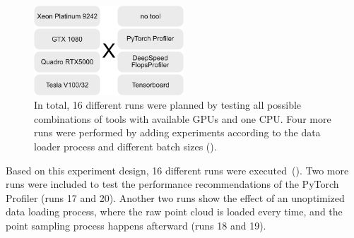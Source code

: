 \documentclass[12pt, a4paper, hidelinks]{article}
\begin{document}
\begin{figure}[H]
\centering
\includegraphics[width=0.5\textwidth]{./assets/experiments.png}
\caption[Overview of the runs]{In total, 16 different runs were planned by testing all possible combinations of tools with available \ac{GPU}s and one \ac{CPU}. Four more runs were performed by adding experiments according to the data loader process and different batch sizes ().}
\label{fig:experiments}
\end{figure}

Based on this experiment design, 16 different runs were executed~().
Two more runs were included to test the performance recommendations of the PyTorch Profiler (runs 17 and 20).
Another two runs show the effect of an unoptimized data loading process, where the raw point cloud is loaded every time, and the point sampling process happens afterward (runs 18 and 19).
\end{document}
